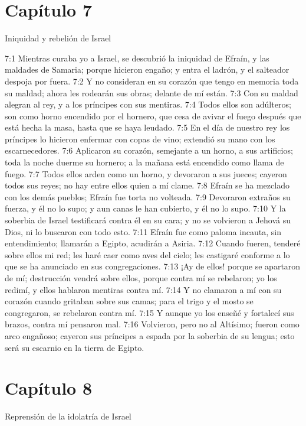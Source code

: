 \section*{Capítulo 7 }
						Iniquidad y rebelión de Israel 
						
						7:1 Mientras curaba yo a Israel, se descubrió la iniquidad de Efraín, y las maldades de Samaria; porque hicieron engaño; y entra el ladrón, y el salteador despoja por fuera. 
						7:2 Y no consideran en su corazón que tengo en memoria toda su maldad; ahora les rodearán sus obras; delante de mí están. 
						7:3 Con su maldad alegran al rey, y a los príncipes con sus mentiras. 
						7:4 Todos ellos son adúlteros; son como horno encendido por el hornero, que cesa de avivar el fuego después que está hecha la masa, hasta que se haya leudado. 
						7:5 En el día de nuestro rey los príncipes lo hicieron enfermar con copas de vino; extendió su mano con los escarnecedores. 
						7:6 Aplicaron su corazón, semejante a un horno, a sus artificios; toda la noche duerme su hornero; a la mañana está encendido como llama de fuego. 
						7:7 Todos ellos arden como un horno, y devoraron a sus jueces; cayeron todos sus reyes; no hay entre ellos quien a mí clame. 
						7:8 Efraín se ha mezclado con los demás pueblos; Efraín fue torta no volteada. 
						7:9 Devoraron extraños su fuerza, y él no lo supo; y aun canas le han cubierto, y él no lo supo. 
						7:10 Y la soberbia de Israel testificará contra él en su cara; y no se volvieron a Jehová su Dios, ni lo buscaron con todo esto. 
						7:11 Efraín fue como paloma incauta, sin entendimiento; llamarán a Egipto, acudirán a Asiria. 
						7:12 Cuando fueren, tenderé sobre ellos mi red; les haré caer como aves del cielo; les castigaré conforme a lo que se ha anunciado en sus congregaciones. 
						7:13 ¡Ay de ellos! porque se apartaron de mí; destrucción vendrá sobre ellos, porque contra mí se rebelaron; yo los redimí, y ellos hablaron mentiras contra mí. 
						7:14 Y no clamaron a mí con su corazón cuando gritaban sobre sus camas; para el trigo y el mosto se congregaron, se rebelaron contra mí. 
						7:15 Y aunque yo los enseñé y fortalecí sus brazos, contra mí pensaron mal. 
						7:16 Volvieron, pero no al Altísimo; fueron como arco engañoso; cayeron sus príncipes a espada por la soberbia de su lengua; esto será su escarnio en la tierra de Egipto. 
\section*{Capítulo 8 }
							Reprensión de la idolatría de Israel 
							
